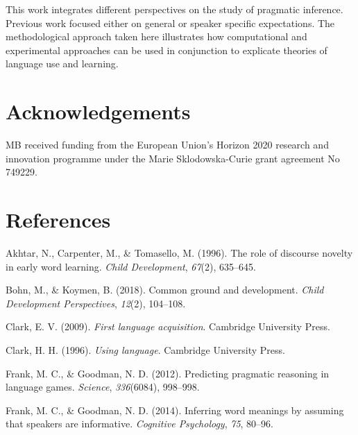 \documentclass[10pt, letterpaper]{article}
\begin{document}
This work integrates different perspectives on the study of pragmatic
inference. Previous work focused either on general or speaker specific
expectations. The methodological approach taken here illustrates how
computational and experimental approaches can be used in conjunction to
explicate theories of language use and learning.

\vspace{1em}
\vspace{1em}

\section{Acknowledgements}\label{acknowledgements}

MB received funding from the European Union's Horizon 2020 research and
innovation programme under the Marie Sklodowska-Curie grant agreement No
749229.

\section{References}\label{references}

\setlength{\parindent}{-0.1in} \setlength{\leftskip}{0.125in} \noindent

\hypertarget{refs}{}
\hypertarget{ref-akhtar1996role}{}
Akhtar, N., Carpenter, M., \& Tomasello, M. (1996). The role of
discourse novelty in early word learning. \emph{Child Development},
\emph{67}(2), 635--645.

\hypertarget{ref-bohn2018common}{}
Bohn, M., \& Koymen, B. (2018). Common ground and development.
\emph{Child Development Perspectives}, \emph{12}(2), 104--108.

\hypertarget{ref-clark2009first}{}
Clark, E. V. (2009). \emph{First language acquisition}. Cambridge
University Press.

\hypertarget{ref-clark1996using}{}
Clark, H. H. (1996). \emph{Using language}. Cambridge University Press.

\hypertarget{ref-frank2012predicting}{}
Frank, M. C., \& Goodman, N. D. (2012). Predicting pragmatic reasoning
in language games. \emph{Science}, \emph{336}(6084), 998--998.

\hypertarget{ref-frank2014inferring}{}
Frank, M. C., \& Goodman, N. D. (2014). Inferring word meanings by
assuming that speakers are informative. \emph{Cognitive Psychology},
\emph{75}, 80--96.
\end{document}
